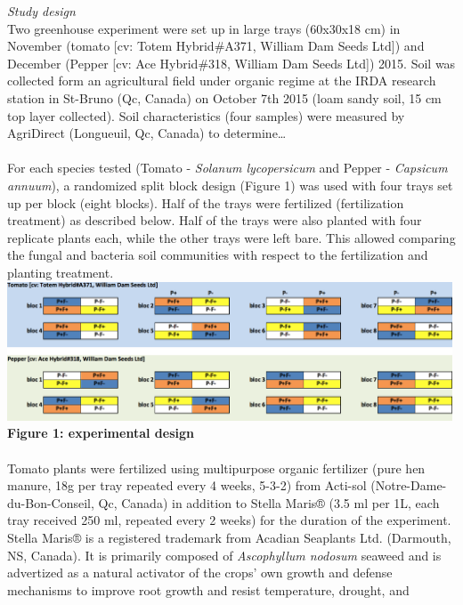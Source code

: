 \documentclass[11pt,]{article}
\begin{document}
\emph{Study design}\\
Two greenhouse experiment were set up in large trays (60x30x18 cm) in
November (tomato {[}cv: Totem Hybrid\#A371, William Dam Seeds Ltd{]})
and December (Pepper {[}cv: Ace Hybrid\#318, William Dam Seeds Ltd{]})
2015. Soil was collected form an agricultural field under organic regime
at the IRDA research station in St-Bruno (Qc, Canada) on October 7th
2015 (loam sandy soil, 15 cm top layer collected). Soil characteristics
(four samples) were measured by AgriDirect (Longueuil, Qc, Canada) to
determine\ldots{}\\
\hspace*{0.333em}\\
For each species tested (Tomato - \emph{Solanum lycopersicum} and Pepper
- \emph{Capsicum annuum}), a randomized split block design (Figure 1)
was used with four trays set up per block (eight blocks). Half of the
trays were fertilized (fertilization treatment) as described below. Half
of the trays were also planted with four replicate plants each, while
the other trays were left bare. This allowed comparing the fungal and
bacteria soil communities with respect to the fertilization and planting
treatment. ~\\
\includegraphics[width=5.20833in]{../figures/Figure1.png}\\
\textbf{Figure 1: experimental design}\\
\hspace*{0.333em}\\
Tomato plants were fertilized using multipurpose organic fertilizer
(pure hen manure, 18g per tray repeated every 4 weeks, 5-3-2) from
Acti-sol (Notre-Dame-du-Bon-Conseil, Qc, Canada) in addition to Stella
Maris® (3.5 ml per 1L, each tray received 250 ml, repeated every 2
weeks) for the duration of the experiment. Stella Maris® is a registered
trademark from Acadian Seaplants Ltd. (Darmouth, NS, Canada). It is
primarily composed of \emph{Ascophyllum nodosum} seaweed and is
advertized as a natural activator of the crops' own growth and defense
mechanisms to improve root growth and resist temperature, drought, and
\end{document}
